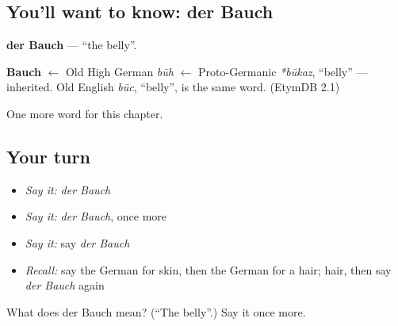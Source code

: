 \subsection*{You'll want to know: der Bauch}
\textbf{der Bauch} — \textquotedblleft{}the belly\textquotedblright{}.

\begin{cousinweb}
\textbf{Bauch} $\leftarrow$ Old High German \emph{būh} $\leftarrow$ Proto-Germanic \emph{*būkaz}, \textquotedblleft{}belly\textquotedblright{} — inherited. Old English \emph{būc}, \textquotedblleft{}belly\textquotedblright{}, is the same word. (EtymDB 2.1)
\end{cousinweb}

\begin{grammarlens}[title={What you've built}]
One more word for this chapter.
\end{grammarlens}

\subsection*{Your turn}
\begin{itemize}
\raggedright
  \item \emph{Say it:} \emph{der Bauch}
  \item \emph{Say it:} \emph{der Bauch}, once more
  \item \emph{Say it:} say \emph{der Bauch}
  \item \emph{Recall:} say the German for skin, then the German for a hair; hair, then say \emph{der Bauch} again
\end{itemize}

\begin{tcolorbox}[breakable,colback=teal!4,colframe=teal!35!black,title={Before you move on}]
What does der Bauch mean? (\textquotedblleft{}The belly\textquotedblright{}.) Say it once more.
\end{tcolorbox}
